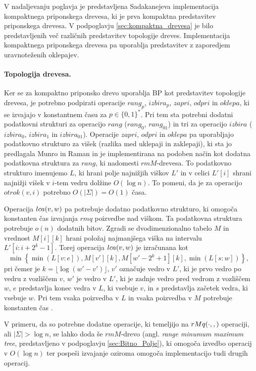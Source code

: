 V nadaljevanju poglavja je predstavljena Sadakanejeva \cite{Sadakane2007} implementacija kompaktnega priponskega drevesa, ki je prva kompaktna predstavitev priponskega drevesa. V podpoglavju \ref{sec:kompaktna_drevesa} je bilo predstavljenih več različnih predstavitev topologije dreves. Implementacija kompaktnega priponskega drevesa pa uporablja predstavitev z zaporedjem uravnoteženih oklepajev.

\paragraph{Topologija drevesa.}
Ker se za kompaktno priponsko drevo uporablja BP kot predstavitev topologije drevesa, je potrebno podpirati operacije $rang_p$, $izbira_p$, $zapri$, $odpri$ in $oklepa$, ki se izvajajo v konstantnem času za $p\in\{0,1\} ^*$. Pri tem sta potrebni dodatni podatkovni strukturi za operacijo $rang$ ($rang_0$, $rang_{01}$) in tri za operacijo $izbira$ ($izbira_0$, $izbira_1$ in $izbira_{01}$). Operacije $zapri$, $odpri$ in $oklepa$ pa uporabljajo podatkovno strukturo za višek (razlika med uklepaji in zaklepaji), ki sta jo predlagala Munro in Raman \cite{Munro1997} in je implementirana na podoben način kot dodatna podatkovna struktura za $rang$, ki nadomesti $rmM$-drevesa. To podatkovno strukturo imenujemo $L$, ki hrani polje najnižjih viškov $L'$ in v celici $L'[i]$ shrani najnižji višek v $i$-tem vedru dolžine $O(\log{n})$. To pomeni, da je za operacijo $otrok(v,i)$ potrebno $O(|\Sigma|)=O(1)$ časa. 

Operacija $ \mathop{lca}(v,w) $ pa potrebuje dodatno podatkovno strukturo, ki omogoča konstanten čas izvajanja $rmq$ poizvedbe nad viškom. Ta podatkovna struktura potrebuje $o(n)$ dodatnih bitov. Zgradi se dvodimenzionalno tabelo $M$ in vrednost $M[i][k]$ hrani položaj najmanjšega viška na intervalu $L'[i:i+2^k-1]$. Torej operacija $ \mathop{lca}(v,w) $ je izračunana  kot
\begin{equation*}
    \min\left\{\min(L[v:e]),M[v'][k],M[w'-2^k+1][k],\min(L[s:w])\right\},
\end{equation*}
pri čemer je $k=\lfloor \log{(w'-v')\rfloor}$, $v'$ označuje vedro v $L'$, ki je prvo vedro po vedru z vozliščem $v$, $w'$ je vedro v $L'$, ki je zadnje vedro pred vedrom z vozliščem $w$, $e$ predstavlja konec vedra v $L$, ki vsebuje $v$, in $s$ predstavlja začetek vedra, ki vsebuje $w$. Pri tem vsaka poizvedba v $L$ in vsaka poizvedba v $M$ potrebuje konstanten čas \cite{Sadakane2007,Valimaki2007}. 

V primeru, da so potrebne dodatne operacije, ki temeljijo na $ \mathop{rMq}(\cdot,,) $ operaciji, ali $|\Sigma|>\log{n}$, se lahko doda še $rmM$-drevo (angl. \textit{range minumum maximum tree}, predstavljeno v podpoglavju \ref{sec:Bitno_Polje}), ki omogoča izvedbo operacij v $O(\log{n})$ ter pospeši izvajanje oziroma omogoča implementacijo tudi drugih operacij.

